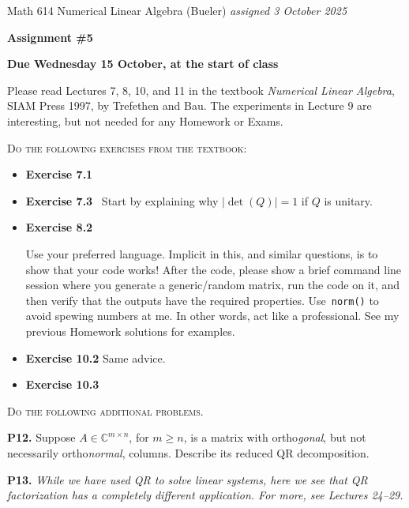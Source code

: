 \documentclass[12pt,dvipsnames]{amsart}
\newcommand{\CC}{\mathbb{C}}
\newcommand{\prob}[1]{\bigskip\noindent\textbf{#1.}\quad }
\begin{document}
\scriptsize \noindent Math 614 Numerical Linear Algebra (Bueler) \hfill \emph{assigned 3 October 2025}
\normalsize\medskip

\Large\centerline{\textbf{Assignment \#5}}
\large
\medskip

\centerline{\textbf{Due Wednesday 15 October, at the start of class}}
\medskip
\normalsize

\thispagestyle{empty}

\bigskip

\noindent Please read Lectures 7, 8, 10, and 11 in the textbook \emph{Numerical Linear Algebra}, SIAM Press 1997, by Trefethen and Bau.  The experiments in Lecture 9 are interesting, but not needed for any Homework or Exams.

\bigskip
\noindent \textsc{Do the following exercises from the textbook}:

\begin{itemize}[itemsep=4pt]
\item \textbf{Exercise 7.1}
\item \textbf{Exercise 7.3} \quad\, Start by explaining why $|\det(Q)|=1$ if $Q$ is unitary.
\item \textbf{Exercise 8.2} \quad\, \begin{minipage}[t]{0.68\textwidth}  Use your preferred language.  Implicit in this, and similar questions, is to show that your code works!  After the code, please show a brief command line session where you generate a generic/random matrix, run the code on it, and then verify that the outputs have the required properties.  Use \,\texttt{norm()} to avoid spewing numbers at me.  In other words, act like a professional.  See my previous Homework solutions for examples. \end{minipage}
\item \textbf{Exercise 10.2} \quad Same advice.
\item \textbf{Exercise 10.3}
\end{itemize}


\medskip
\noindent \textsc{Do the following additional problems.}

\prob{P12}  Suppose $A\in \CC^{m\times n}$, for $m\ge n$, is a matrix with ortho\emph{gonal}, but not necessarily ortho\emph{normal}, columns.  Describe its reduced QR decomposition.


\prob{P13}  \emph{While we have used QR to solve linear systems, here we see that QR factorization has a completely different application.  For more, see Lectures 24--29.}
\end{document}
